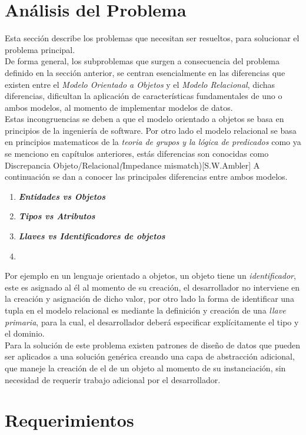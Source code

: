\section{Análisis del Problema}
\noindent Esta sección describe los problemas que necesitan ser resueltos, para solucionar el problema principal.\\
\indent De forma general, los subproblemas que surgen a consecuencia del problema definido en la sección anterior,
\noindent se centran esencialmente en las diferencias que existen entre el \textit{Modelo Orientado a Objetos} y el
\noindent \textit{Modelo Relacional}, dichas diferencias, dificultan la aplicación de características fundamentales
\noindent de uno o ambos modelos, al momento de implementar modelos de datos.\\
\noindent Estas incongruencias se deben a que el modelo orientado a objetos se basa en principios de la ingeniería
\noindent de software. Por otro lado el modelo relacional se basa en principios matematicos de la
\noindent \textit{teoria de grupos y la lógica de predicados} como ya se menciono en capítulos anteriores, estás diferencias
\noindent son conocidas como Discrepancia Objeto/Relacional\textit(Impedance mismatch)[S.W.Ambler]
\noindent A continuación se dan a conocer las principales diferencias entre ambos modelos.
\begin{enumerate}
    \item \textbf{\textit{Entidades vs Objetos}}
    \item \textbf{\textit{Tipos vs Atributos}}
    \item \textbf{\textit{Llaves vs Identificadores de objetos}}
    \item \textbf{}
\end{enumerate}
\noindent Por ejemplo en un lenguaje orientado a objetos,
\noindent un objeto tiene un \textit{identificador}, este es asignado al él al momento de su creación, el desarrollador no
\noindent interviene en la creación y asignación de dicho valor, por otro lado la forma de identificar una tupla en el modelo
\noindent relacional es mediante la definición y creación de una \textit{llave primaria}, para la cual, el desarrollador deberá
\noindent especificar explícitamente el tipo y el dominio.\\ Para la solución de este problema existen patrones de diseño
\noindent de datos que pueden ser aplicados a una solución genérica creando una capa de abstracción adicional, que maneje
\noindent la creación de el  de un objeto al momento de su instanciación, sin necesidad de requerir
\noindent trabajo adicional por el desarrollador.
\section{Requerimientos}
